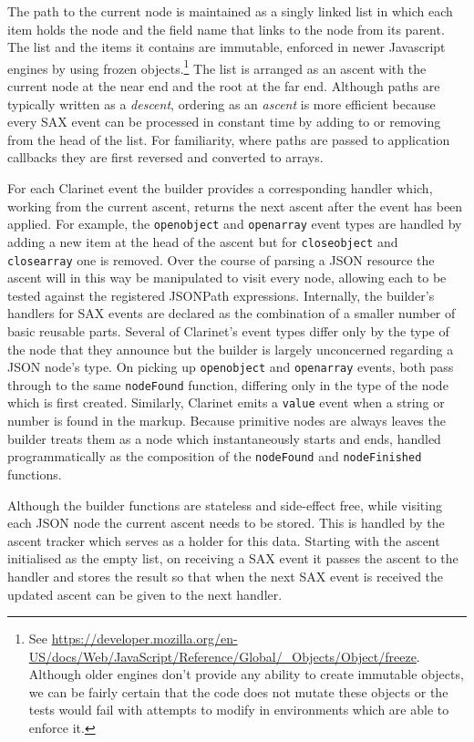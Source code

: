 \documentclass[12pt, ]{article}
\begin{document}
The path to the current node is maintained as a singly linked list in
which each item holds the node and the field name that links to the node
from its parent. The list and the items it contains are immutable,
enforced in newer Javascript engines by using frozen objects.\footnote{See
  \url{https://developer.mozilla.org/en-US/docs/Web/JavaScript/Reference/Global/_Objects/Object/freeze}.
  Although older engines don't provide any ability to create immutable
  objects, we can be fairly certain that the code does not mutate these
  objects or the tests would fail with attempts to modify in
  environments which are able to enforce it.} The list is arranged as an
ascent with the current node at the near end and the root at the far
end. Although paths are typically written as a \emph{descent}, ordering
as an \emph{ascent} is more efficient because every SAX event can be
processed in constant time by adding to or removing from the head of the
list. For familiarity, where paths are passed to application callbacks
they are first reversed and converted to arrays.

For each Clarinet event the builder provides a corresponding handler
which, working from the current ascent, returns the next ascent after
the event has been applied. For example, the \texttt{openobject} and
\texttt{openarray} event types are handled by adding a new item at the
head of the ascent but for \texttt{closeobject} and \texttt{closearray}
one is removed. Over the course of parsing a JSON resource the ascent
will in this way be manipulated to visit every node, allowing each to be
tested against the registered JSONPath expressions. Internally, the
builder's handlers for SAX events are declared as the combination of a
smaller number of basic reusable parts. Several of Clarinet's event
types differ only by the type of the node that they announce but the
builder is largely unconcerned regarding a JSON node's type. On picking
up \texttt{openobject} and \texttt{openarray} events, both pass through
to the same \texttt{nodeFound} function, differing only in the type of
the node which is first created. Similarly, Clarinet emits a
\texttt{value} event when a string or number is found in the markup.
Because primitive nodes are always leaves the builder treats them as a
node which instantaneously starts and ends, handled programmatically as
the composition of the \texttt{nodeFound} and \texttt{nodeFinished}
functions.

Although the builder functions are stateless and side-effect free, while
visiting each JSON node the current ascent needs to be stored. This is
handled by the ascent tracker which serves as a holder for this data.
Starting with the ascent initialised as the empty list, on receiving a
SAX event it passes the ascent to the handler and stores the result so
that when the next SAX event is received the updated ascent can be given
to the next handler.
\end{document}
